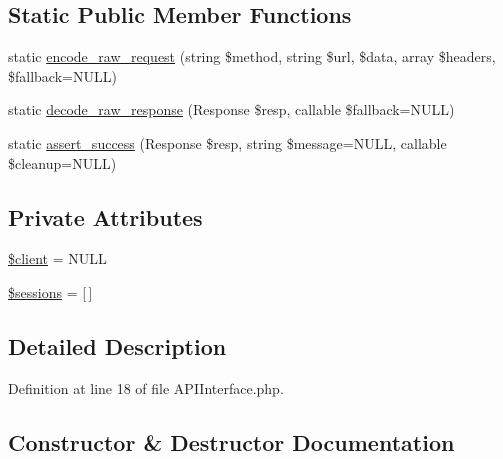 \subsection*{Static Public Member Functions}
\begin{DoxyCompactItemize}
\item 
static \hyperlink{classlibresignage_1_1tests_1_1common_1_1classes_1_1APIInterface_ad37b605173dc47cb56ea75cf65ec1e18}{encode\+\_\+raw\+\_\+request} (string \$method, string \$url, \$data, array \$headers, \$fallback=N\+U\+LL)
\item 
static \hyperlink{classlibresignage_1_1tests_1_1common_1_1classes_1_1APIInterface_a7488fc7def8ea478483e3334b0906517}{decode\+\_\+raw\+\_\+response} (Response \$resp, callable \$fallback=N\+U\+LL)
\item 
static \hyperlink{classlibresignage_1_1tests_1_1common_1_1classes_1_1APIInterface_ae27d5b503d177b503c4797ab4dd077a9}{assert\+\_\+success} (Response \$resp, string \$message=N\+U\+LL, callable \$cleanup=N\+U\+LL)
\end{DoxyCompactItemize}
\subsection*{Private Attributes}
\begin{DoxyCompactItemize}
\item 
\hyperlink{classlibresignage_1_1tests_1_1common_1_1classes_1_1APIInterface_a52f812d808cc57bdadca2587a031ec55}{\$client} = N\+U\+LL
\item 
\hyperlink{classlibresignage_1_1tests_1_1common_1_1classes_1_1APIInterface_aae17c145c9c4370e4ee2dfe18ba10972}{\$sessions} = \mbox{[}$\,$\mbox{]}
\end{DoxyCompactItemize}


\subsection{Detailed Description}


Definition at line 18 of file A\+P\+I\+Interface.\+php.



\subsection{Constructor \& Destructor Documentation}
\mbox{\label{classlibresignage_1_1tests_1_1common_1_1classes_1_1APIInterface_abed318dd391fefec1148901f0dd696f9}} 
